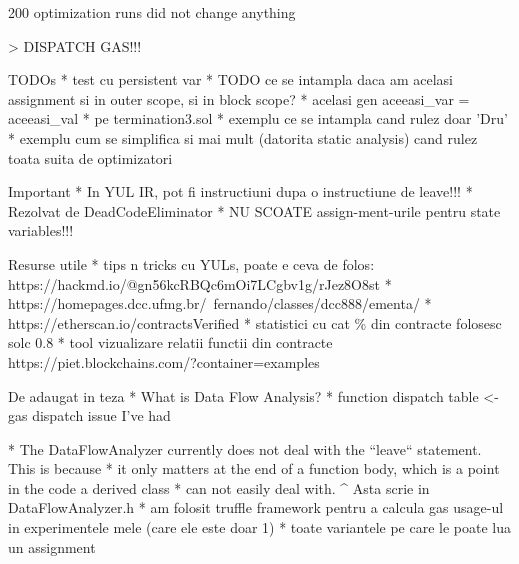 200 optimization runs did not change anything

> DISPATCH GAS!!!







TODOs
* test cu persistent var
* TODO ce se intampla daca am acelasi assignment si in outer scope, si in block scope?
* acelasi gen aceeasi_var = aceeasi_val
* pe termination3.sol
  * exemplu ce se intampla cand rulez doar 'Dru'
  * exemplu cum se simplifica si mai mult (datorita static analysis) cand rulez toata suita de optimizatori




Important
* In YUL IR, pot fi instructiuni dupa o instructiune de leave!!!
  * Rezolvat de DeadCodeEliminator
* NU SCOATE assign-ment-urile pentru state variables!!!


Resurse utile
* tips n tricks cu YULs, poate e ceva de folos: https://hackmd.io/@gn56kcRBQc6mOi7LCgbv1g/rJez8O8st
* https://homepages.dcc.ufmg.br/~fernando/classes/dcc888/ementa/
* https://etherscan.io/contractsVerified
  * statistici cu cat \% din contracte folosesc solc 0.8
* tool vizualizare relatii functii din contracte https://piet.blockchains.com/?container=examples%


De adaugat in teza
* What is Data Flow Analysis?
* function dispatch table <- gas dispatch issue I've had

  * The DataFlowAnalyzer currently does not deal with the ``leave`` statement. This is because
  * it only matters at the end of a function body, which is a point in the code a derived class
  * can not easily deal with.
  ^ Asta scrie in DataFlowAnalyzer.h
* am folosit truffle framework pentru a calcula gas usage-ul in experimentele mele (care ele este doar 1)
* toate variantele pe care le poate lua un assignment


